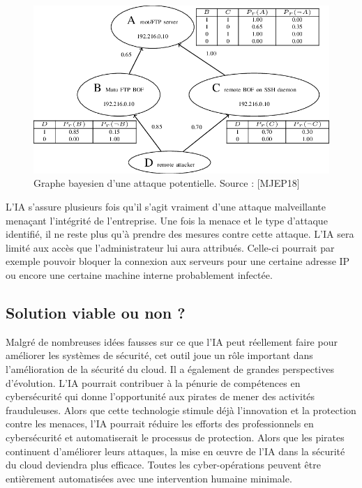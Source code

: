 \documentclass[a4paper, 12pt]{article}
\begin{document}
      \begin{figure}[h]
        \centering
        \includegraphics[scale=.4]{img/attackgraph.png}
        \caption{Graphe bayesien d’une attaque potentielle. Source : [MJEP18]}
        \label{fig:1}
      \end{figure}

      L’IA s’assure plusieurs fois qu’il s’agit vraiment d’une attaque
      malveillante menaçant l’intégrité de l’entreprise. Une fois la menace et
      le type d’attaque identifié, il ne reste plus qu’à prendre des mesures
      contre cette attaque. L’IA sera limité aux accès que l’administrateur lui
      aura attribués. Celle-ci pourrait par exemple pouvoir bloquer la connexion
      aux serveurs pour une certaine adresse IP ou encore une certaine machine
      interne probablement infectée.

    \subsection{Solution viable ou non ?}
      Malgré de nombreuses idées fausses sur ce que l'IA peut réellement
      faire pour améliorer les systèmes de sécurité, cet outil joue un rôle
      important dans l'amélioration de la sécurité du cloud. Il a également de
      grandes perspectives d’évolution. L’IA pourrait contribuer à la pénurie de
      compétences en cybersécurité qui donne l'opportunité aux pirates de mener
      des activités frauduleuses. Alors que cette technologie stimule déjà
      l'innovation et la protection contre les menaces, l'IA pourrait réduire
      les efforts des professionnels en cybersécurité et automatiserait le
      processus de protection. Alors que les pirates continuent d'améliorer
      leurs attaques, la mise en œuvre de l'IA dans la sécurité du cloud
      deviendra plus efficace. Toutes les cyber-opérations peuvent être
      entièrement automatisées avec une intervention humaine minimale. \\
\end{document}
